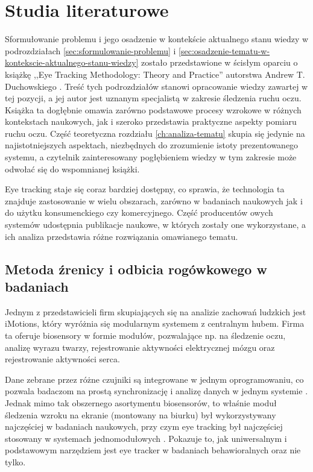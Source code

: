 \documentclass[a4paper,twoside,12pt]{book}
\begin{document}
\section{Studia literaturowe}
\label{sec:studia-literaturowe}

Sformułowanie problemu i jego osadzenie w kontekście aktualnego stanu wiedzy w podrozdziałach \ref{sec:sformulowanie-problemu} i \ref{sec:osadzenie-tematu-w-kontekscie-aktualnego-stanu-wiedzy} zostało przedstawione w ścisłym oparciu o książkę ,,Eye Tracking Methodology: Theory and Practice'' autorstwa Andrew T. Duchowskiego \cite{bib:eye-tracking-methodology}. Treść tych podrozdziałów stanowi opracowanie wiedzy zawartej w tej pozycji, a jej autor jest uznanym specjalistą w zakresie śledzenia ruchu oczu. Książka ta dogłębnie omawia zarówno podstawowe procesy wzrokowe w różnych kontekstach naukowych, jak i szeroko przedstawia praktyczne aspekty pomiaru ruchu oczu. Część teoretyczna rozdziału \ref{ch:analiza-tematu} skupia się jedynie na najistotniejszych aspektach, niezbędnych do zrozumienie istoty prezentowanego systemu, a czytelnik zainteresowany pogłębieniem wiedzy w tym zakresie może odwołać się do wspomnianej książki.

Eye tracking staje się coraz bardziej dostępny, co sprawia, że technologia ta znajduje zastosowanie w wielu obszarach, zarówno w badaniach naukowych jak i do użytku konsumenckiego czy komercyjnego. Część producentów owych systemów udostępnia publikacje naukowe, w których zostały one wykorzystane, a ich analiza przedstawia różne rozwiązania omawianego tematu.

\subsection{Metoda źrenicy i odbicia rogówkowego w badaniach}
\label{subsec:metoda-zrenicy-i-odbicia-rogowkowego-w-badaniach}

Jednym z przedstawicieli firm skupiających się na analizie zachowań ludzkich jest iMotions, który wyróżnia się modularnym systemem z centralnym hubem. Firma ta oferuje biosensory w formie modułów, pozwalające np. na śledzenie oczu, analizę wyrazu twarzy, rejestrowanie aktywności elektrycznej mózgu oraz rejestrowanie aktywności serca.

Dane zebrane przez różne czujniki są integrowane w jednym oprogramowaniu, co pozwala badaczom na prostą synchronizację i analizę danych w jednym systemie \cite{bib:iMotions-about-us}. Jednak mimo tak obszernego asortymentu biosensorów, to właśnie moduł śledzenia wzroku na ekranie (montowany na biurku) był wykorzystywany najczęściej w badaniach naukowych, przy czym eye tracking był najczęściej stosowany w systemach jednomodułowych \cite{bib:iMotions-2023-report}. Pokazuje to, jak uniwersalnym i podstawowym narzędziem jest eye tracker w badaniach behawioralnych oraz nie tylko.
\end{document}
